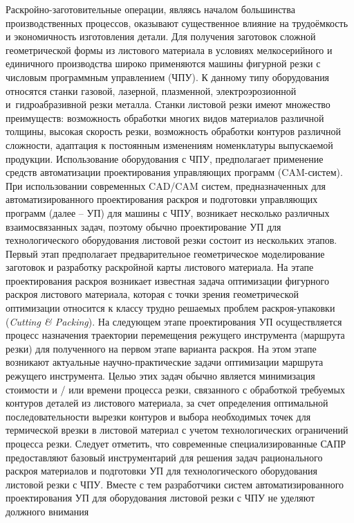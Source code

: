 \documentclass[14pt]{extarticle}
\begin{document}
Раскройно-заготовительные операции,
являясь началом большинства производственных процессов,
оказывают существенное влияние на трудоёмкость
и экономичность изготовления детали.
Для получения заготовок сложной
геометрической формы из листового материала в условиях мелкосерийного и
единичного производства широко применяются машины фигурной резки с
числовым программным управлением
(ЧПУ).
К данному типу оборудования
относятся станки газовой, лазерной, плазменной, электроэрозионной
и~гидроабразивной резки металла. 
Станки листовой резки имеют множество преимуществ: 
возможность обработки многих видов материалов различной толщины, 
высокая скорость резки, возможность обработки контуров различной сложности, 
адаптация к постоянным изменениям номенклатуры выпускаемой продукции. 
Использование оборудования с ЧПУ, предполагает применение
средств автоматизации проектирования управляющих программ
(CAM-систем).
При использовании современных CAD/CAM систем, предназначенных для
автоматизированного проектирования раскроя и подготовки
управляющих программ 
(далее -- УП)
для машины с ЧПУ, возникает несколько различных взаимосвязанных задач,
поэтому обычно
проектирование УП для технологического оборудования листовой резки 
состоит из нескольких этапов. 
Первый этап предполагает предварительное геометрическое моделирование заготовок 
и разработку раскройной карты листового материала. 
На этапе проектирования раскроя возникает известная задача оптимизации фигурного раскроя листового материала, 
которая с точки зрения геометрической оптимизации
относится к классу трудно решаемых проблем раскроя-упаковки 
({\it Cutting \& Packing}). 
На следующем этапе проектирования УП осуществляется процесс назначения траектории 
перемещения режущего инструмента 
(маршрута резки) 
для полученного на первом этапе варианта раскроя. 
На этом этапе возникают актуальные научно-практические задачи 
оптимизации маршрута режущего инструмента. 
Целью этих задач обычно является минимизация стоимости и / или времени процесса резки, 
связанного с обработкой требуемых контуров деталей из листового материала, 
за счет определения оптимальной последовательности вырезки контуров 
и выбора необходимых точек для термической врезки в листовой материал 
с учетом технологических ограничений процесса резки. 
Следует отметить, что современные специализированные САПР предоставляют 
базовый инструментарий для решения задач рационального раскроя материалов 
и подготовки УП для технологического оборудования листовой резки с ЧПУ. 
Вместе с тем разработчики систем автоматизированного проектирования УП 
для оборудования листовой резки с ЧПУ не уделяют должного внимания 
\end{document}
